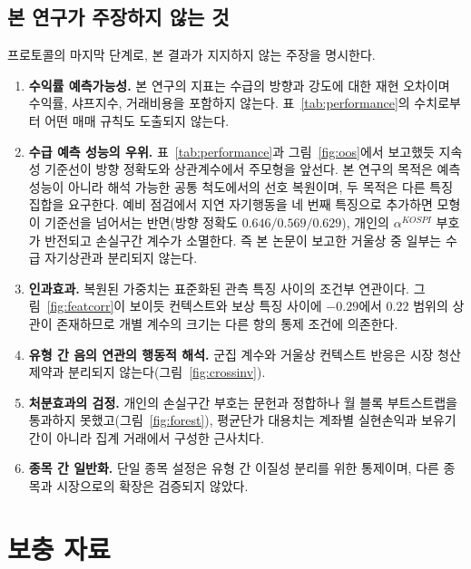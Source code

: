 \subsection{본 연구가 주장하지 않는 것}
\label{sec:notclaim}

프로토콜의 마지막 단계로, 본 결과가 지지하지 않는 주장을 명시한다.

\begin{enumerate}
\item \textbf{수익률 예측가능성.} 본 연구의 지표는 수급의 방향과 강도에 대한
재현 오차이며 수익률, 샤프지수, 거래비용을 포함하지 않는다.
표~\ref{tab:performance}의 수치로부터 어떤 매매 규칙도 도출되지 않는다.

\item \textbf{수급 예측 성능의 우위.} 표~\ref{tab:performance}과
그림~\ref{fig:oos}에서 보고했듯 지속성 기준선이 방향 정확도와 상관계수에서
주모형을 앞선다. 본 연구의 목적은 예측 성능이 아니라 해석 가능한 공통 척도에서의
선호 복원이며, 두 목적은 다른 특징 집합을 요구한다. 예비 점검에서 지연
자기행동을 네 번째 특징으로 추가하면 모형이 기준선을 넘어서는 반면(방향 정확도
$0.646/0.569/0.629$), 개인의 $\alpha^{KOSPI}$ 부호가 반전되고 손실구간 계수가
소멸한다. 즉 본 논문이 보고한 거울상 중 일부는 수급 자기상관과 분리되지 않는다.

\item \textbf{인과효과.} 복원된 가중치는 표준화된 관측 특징 사이의 조건부
연관이다. 그림~\ref{fig:featcorr}이 보이듯 컨텍스트와 보상 특징 사이에 $-0.29$에서
$0.22$ 범위의 상관이 존재하므로 개별 계수의 크기는 다른 항의 통제 조건에
의존한다.

\item \textbf{유형 간 음의 연관의 행동적 해석.} 군집 계수와 거울상 컨텍스트
반응은 시장 청산 제약과 분리되지 않는다(그림~\ref{fig:crossinv}).

\item \textbf{처분효과의 검정.} 개인의 손실구간 부호는 문헌과 정합하나 월 블록
부트스트랩을 통과하지 못했고(그림~\ref{fig:forest}), 평균단가 대용치는 계좌별
실현손익과 보유기간이 아니라 집계 거래에서 구성한 근사치다.

\item \textbf{종목 간 일반화.} 단일 종목 설정은 유형 간 이질성 분리를 위한
통제이며, 다른 종목과 시장으로의 확장은 검증되지 않았다.
\end{enumerate}

\appendix

\section{보충 자료}
\label{sec:appendix}

